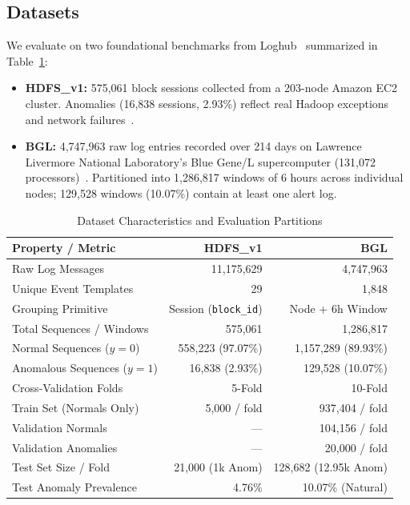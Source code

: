 \documentclass[conference]{IEEEtran}
\begin{document}
\subsection{Datasets}
We evaluate on two foundational benchmarks from Loghub~\cite{he2023loghub} summarized in Table~\ref{tab:dataset_stats}:
\begin{itemize}
    \item \textbf{HDFS\_v1:} 575,061 block sessions collected from a 203-node Amazon EC2 cluster. Anomalies (16,838 sessions, 2.93\%) reflect real Hadoop exceptions and network failures~\cite{xu2009detecting}.
    \item \textbf{BGL:} 4,747,963 raw log entries recorded over 214 days on Lawrence Livermore National Laboratory's Blue Gene/L supercomputer (131,072 processors)~\cite{oliner2007supercomputer}. Partitioned into 1,286,817 windows of 6 hours across individual nodes; 129,528 windows (10.07\%) contain at least one alert log.
\end{itemize}

\begin{table}[htbp]
\centering
\caption{Dataset Characteristics and Evaluation Partitions}
\label{tab:dataset_stats}
\begin{tabular}{lrr}
\toprule
\textbf{Property / Metric} & \textbf{HDFS\_v1} & \textbf{BGL} \\
\midrule
Raw Log Messages & 11,175,629 & 4,747,963 \\
Unique Event Templates & 29 & 1,848 \\
Grouping Primitive & Session (\texttt{block\_id}) & Node + 6h Window \\
Total Sequences / Windows & 575,061 & 1,286,817 \\
Normal Sequences ($y=0$) & 558,223 (97.07\%) & 1,157,289 (89.93\%) \\
Anomalous Sequences ($y=1$) & 16,838 (2.93\%) & 129,528 (10.07\%) \\
\midrule
Cross-Validation Folds & 5-Fold & 10-Fold \\
Train Set (Normals Only) & 5,000 / fold & 937,404 / fold \\
Validation Normals & --- & 104,156 / fold \\
Validation Anomalies & --- & 20,000 / fold \\
Test Set Size / Fold & 21,000 (1k Anom) & 128,682 (12.95k Anom) \\
Test Anomaly Prevalence & 4.76\% & 10.07\% (Natural) \\
\bottomrule
\end{tabular}
\end{table}
\end{document}
